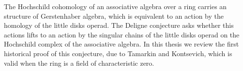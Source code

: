 \documentclass[TFM.tex]{subfiles}
\begin{document}


The Hochschild cohomology of an associative algebra over a ring carries an structure of Gerstenhaber algebra, which is equivalent to an action by the homology of the little disks operad. The Deligne conjecture asks whether this actions lifts to an action by the singular chains of the little disks operad on the Hochschild complex of the associative algebra. In this thesis we review the first historical proof of this conjecture, due to Tamarkin and Kontsevich, which is valid when the ring is a field of characteristic zero. 
\end{document}

